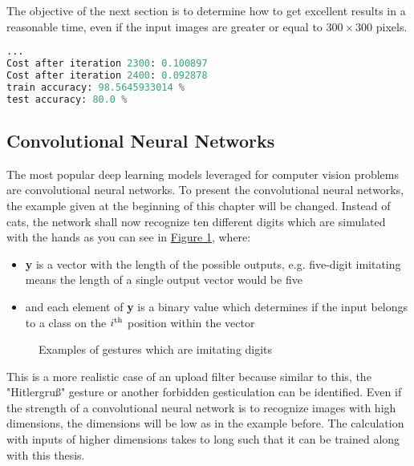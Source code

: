 The objective of the next section is to determine how to get excellent results in a reasonable time, even if the input images are greater or equal to \( 300 \times 300\) pixels.

\begin{lstlisting}[captionpos=b,label={lst:acc2l}, float=tb,language=Python, caption=Test accuracy is 80\% after iteration 2400 times and using 209 examples with 12288 features (\(64\times64 \) pixels). This is not state of the art but very good if considering that this is an algorihm wich is not spezialised to recoginize images.]
...
Cost after iteration 2300: 0.100897
Cost after iteration 2400: 0.092878
train accuracy: 98.5645933014 %
test accuracy: 80.0 %
\end{lstlisting} 

\subsection{Convolutional Neural Networks}
\label{subsec:cnn}

The most popular deep learning models leveraged for computer vision problems are convolutional neural networks. To present the convolutional neural networks, the example given at the beginning of this chapter will be changed. Instead of cats, the network shall now recognize ten different digits which are simulated with the hands as you can see in \hyperref[fig:signs]{Figure \ref{fig:signs}}, where:

\begin{itemize}
	\itemsep-0.8em 
	\item \textbf{y} is a vector with the length of the possible outputs, e.g. five-digit imitating means the length of a single output vector would be five \\
	\item and each element of \textbf{y} is a binary value which determines if the input belongs to a class on the \(i\textsuperscript{th}\) position within the vector\\
\end{itemize}

\begin{figure}[htp]
	\centering
	\caption{Examples of gestures which are imitating digits}
	\label{fig:signs}
\end{figure}

This is a more realistic case of an upload filter because similar to this, the "Hitlergruß" gesture or another forbidden gesticulation can be identified. Even if the strength of a convolutional neural network is to recognize images with high dimensions, the dimensions will be low as in the example before. The calculation with inputs of higher dimensions takes to long such that it can be trained along with this thesis. \cite{DBLP:journals/corr/TraskGR15}\\

